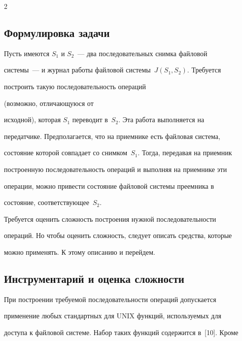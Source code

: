 \begin{multicols}{2}
\subsection{Формулировка задачи}





      Пусть имеются $S_1$ и $S_2$~--- два последовательных снимка файловой 


системы~--- и журнал работы файловой системы~$J(S_1, S_2)$. Требуется 


построить такую последовательность операций\linebreak


(возможно, отличающуюся от 


исходной), которая $S_1$ переводит в~$S_2$. Эта работа выполняется на 


передатчике. Предполагается, что на приемнике есть файловая система, 


состояние которой совпадает со снимком~$S_1$. Тогда, передавая на приемник 


построенную последовательность операций и выполняя на приемнике эти 


операции, можно привести состояние файловой системы преемника в 


состояние, соответствующее~$S_2$.


      


      \smallskip


      Требуется оценить сложность построения нужной последовательности 


операций. Но чтобы оценить сложность, следует описать средства, которые 


можно применять. К этому описанию и перейдем. 


      


      \subsection{Инструментарий и оценка сложности}


      


      При построении требуемой по\-сле\-до\-ва\-тель\-ности операций допускается 


применение любых стандартных для UNIX функций, используемых для 


доступа к файловой системе. Набор таких функций содержится в~[10]. Кроме 



\end{multicols}
